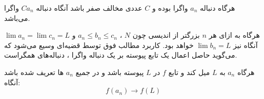 \begin{NOTE}
	\p
هرگاه دنباله
$a_n$
واگرا بوده و
$C$
 عددی مخالف صفر باشد آنگاه دنباله 
$Ca_n$
 واگرا می‌باشد.
\end{NOTE}

\begin{definition}
	\p
{}
هرگاه به ازای هر 
$n$
بزرگتر از اندیسی چون 
$N$
،
$a_n \leq b_n \leq c_n$
 و
$\lim a_n = \lim c_n = L$
آنگاه نیز
$\lim b_n = L$
خواهد بود. کاربرد مطالب فوق توسط قضیه‌ای وسیع می‌شود که می‌گوید حاصل اعمال یک تابع پیوسته بر یک دنباله واگرا ، دنباله‌های همگراست.
\end{definition}

\begin{theorem}
	\p
هرگاه
$a_n$
به
$L$
میل کند و تابع
$f$
در
$L$
پیوسته باشد و در جمیع 
$a_n$
ها تعریف شده باشد آنگاه:
$$f(a_n) \rightarrow f(L)$$
\end{theorem}






